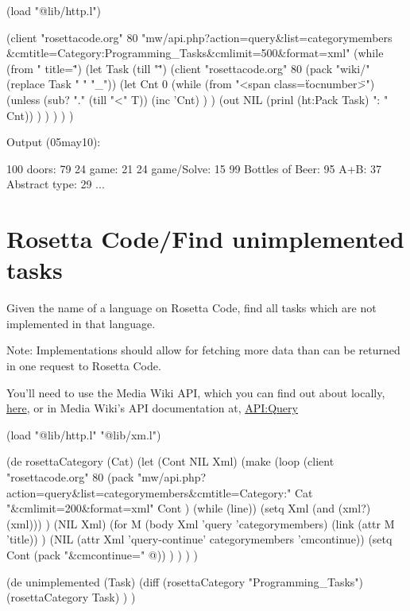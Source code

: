 \begin{wideverbatim}

(load "@lib/http.l")

(client "rosettacode.org" 80
"mw/api.php?action=query\&list=categorymembers
\&cmtitle=Category:Programming_Tasks\&cmlimit=500\&format=xml"
   (while (from " title=\"")
      (let Task (till "\"")
         (client "rosettacode.org" 80 (pack "wiki/" (replace Task " " "_"))
            (let Cnt 0
               (while (from "<span class=\"tocnumber\">")
                  (unless (sub? "." (till "<" T))
                     (inc 'Cnt) ) )
               (out NIL (prinl (ht:Pack Task) ": " Cnt)) ) ) ) ) )

Output (05may10):

100 doors: 79
24 game: 21
24 game/Solve: 15
99 Bottles of Beer: 95
A+B: 37
Abstract type: 29
...

\end{wideverbatim}

\pagebreak{}
\section*{Rosetta Code/Find unimplemented tasks}

Given the name of a language on Rosetta Code, find all tasks which are
not implemented in that language.

Note: Implementations should allow for fetching more data than can be
returned in one request to Rosetta Code.

You'll need to use the Media Wiki API, which you can find out about
locally, \href{http://rosettacode.org/mw/api.php}{here}, or in Media
Wiki's API documentation at,
\href{http://www.mediawiki.org/wiki/API\_Query}{API:Query}

\begin{wideverbatim}

(load "@lib/http.l" "@lib/xm.l")

(de rosettaCategory (Cat)
   (let (Cont NIL  Xml)
      (make
         (loop
            (client "rosettacode.org" 80
               (pack
                  "mw/api.php?action=query\&list=categorymembers\&cmtitle=Category:"
                  Cat
                  "\&cmlimit=200\&format=xml"
                  Cont )
               (while (line))
               (setq Xml (and (xml?) (xml))) )
            (NIL Xml)
            (for M (body Xml 'query 'categorymembers)
               (link (attr M 'title)) )
            (NIL (attr Xml 'query-continue' categorymembers 'cmcontinue))
            (setq Cont (pack "\&cmcontinue=" @)) ) ) ) )

(de unimplemented (Task)
   (diff
      (rosettaCategory "Programming_Tasks")
      (rosettaCategory Task) ) )

\end{wideverbatim}

